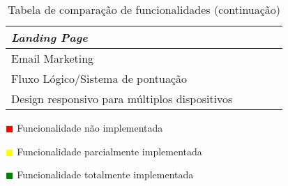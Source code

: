 \begin{table}[!ht]
\begin{center}
\begin{tabular}{|p{4cm}|p{0.1cm}|p{0.1cm}|p{0.1cm}|p{0.1cm}|}
			\textit{Landing Page}  &\cellcolor{red!80}  & \cellcolor{red!80} & \cellcolor{green!80} & \cellcolor{green!80}  \\ \hline
			
			Email Marketing &\cellcolor{red!80}  & \cellcolor{green!80} & \cellcolor{green!80} & \cellcolor{green!80}  \\ \hline
			
			Fluxo Lógico/Sistema de pontuação &\cellcolor{yellow!80}  & \cellcolor{green!80} & \cellcolor{green!80} & \cellcolor{green!80}  \\ \hline
			
			Design responsivo para múltiplos dispositivos & \cellcolor{green!80}  & \cellcolor{green!80} & \cellcolor{green!80} & \cellcolor{green!80}  \\ \hline			
			
		\end{tabular}
	\end{center}
	\hspace{1.2cm}	\textcolor{red}{$\blacksquare$} Funcionalidade não implementada
	
	\hspace{1.2cm}     \textcolor{yellow}{$\blacksquare$} Funcionalidade parcialmente implementada
	
	\hspace{1.2cm}     \textcolor{green}{$\blacksquare$} Funcionalidade totalmente implementada 
	\begin{center}
		\caption{Tabela de comparação de funcionalidades (continuação)}
		\label{tab:comparacao2}
	\end{center}
\end{table}



